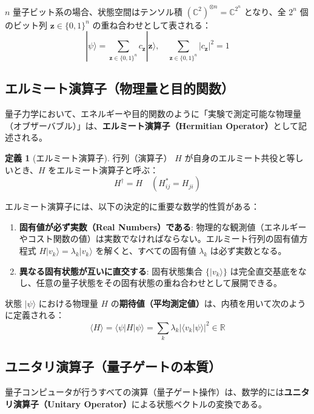 \documentclass[11pt,a4paper]{ltjsarticle}
\theoremstyle{definition}
\newtheorem{definition}{定義}[section]
\theoremstyle{plain}
\theoremstyle{remark}
\newcommand{\ket}[1]{|#1\rangle}
\newcommand{\braket}[2]{\langle#1|#2\rangle}
\newcommand{\mel}[3]{\langle#1|#2|#3\rangle}
\begin{document}
$n$ 量子ビット系の場合、状態空間はテンソル積 $(\mathbb{C}^2)^{\otimes n} = \mathbb{C}^{2^n}$ となり、全 $2^n$ 個のビット列 $\bm{z} \in \{0, 1\}^n$ の重ね合わせとして表される：
\begin{equation}
\ket{\psi} = \sum_{\bm{z} \in \{0, 1\}^n} c_{\bm{z}} \ket{\bm{z}}, \quad \sum_{\bm{z} \in \{0, 1\}^n} |c_{\bm{z}}|^2 = 1
\end{equation}

\subsection{エルミート演算子（物理量と目的関数）}
量子力学において、エネルギーや目的関数のように「実験で測定可能な物理量（オブザーバブル）」は、\textbf{エルミート演算子（Hermitian Operator）}として記述される。

\begin{definition}[エルミート演算子]
行列（演算子） $H$ が自身のエルミート共役と等しいとき、$H$ をエルミート演算子と呼ぶ：
\begin{equation}
H^\dagger = H \quad \left(H_{ij}^* = H_{ji}\right)
\end{equation}
\end{definition}

エルミート演算子には、以下の決定的に重要な数学的性質がある：
\begin{enumerate}
    \item \textbf{固有値が必ず実数（Real Numbers）である}:
    物理的な観測値（エネルギーやコスト関数の値）は実数でなければならない。エルミート行列の固有値方程式 $H \ket{v_k} = \lambda_k \ket{v_k}$ を解くと、すべての固有値 $\lambda_k$ は必ず実数となる。
    \item \textbf{異なる固有状態が互いに直交する}:
    固有状態集合 $\{\ket{v_k}\}$ は完全直交基底をなし、任意の量子状態をその固有状態の重ね合わせとして展開できる。
\end{enumerate}
状態 $\ket{\psi}$ における物理量 $H$ の\textbf{期待値（平均測定値）}は、内積を用いて次のように定義される：
\begin{equation}
\langle H \rangle = \mel{\psi}{H}{\psi} = \sum_k \lambda_k |\braket{v_k}{\psi}|^2 \in \mathbb{R}
\end{equation}

\subsection{ユニタリ演算子（量子ゲートの本質）}
量子コンピュータが行うすべての演算（量子ゲート操作）は、数学的には\textbf{ユニタリ演算子（Unitary Operator）}による状態ベクトルの変換である。
\end{document}
